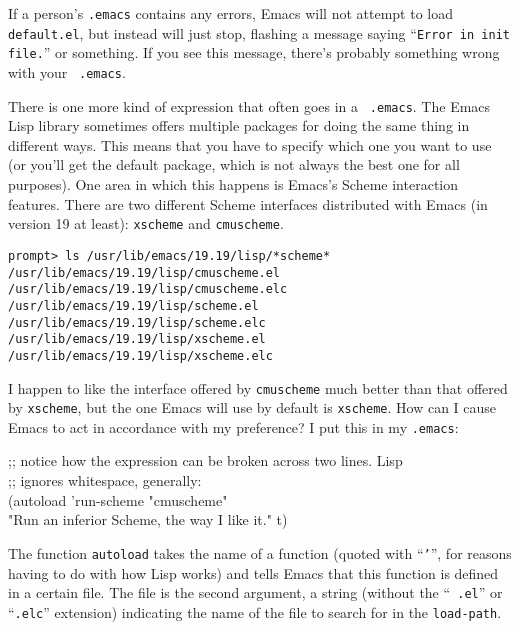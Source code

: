         If a person's {\tt .emacs} contains any errors, Emacs will not
attempt to load {\tt default.el}, but instead will just stop, flashing
a message saying ``{\tt Error in init file.}'' or something.  If you
see this message, there's probably something wrong with your {\tt
.emacs}.

        There is one more kind of expression that often goes in a {\tt
.emacs}.  The Emacs Lisp library sometimes offers multiple packages
for doing the same thing in different ways.  This means that you have
to specify which one you want to use (or you'll get the default
package, which is not always the best one for all purposes).  One area
in which this happens is Emacs's Scheme interaction features.  There
are two different Scheme interfaces distributed with Emacs (in version
19 at least): {\tt xscheme} and {\tt cmuscheme}.

\begin{screen}
   \begin{verbatim}
prompt> ls /usr/lib/emacs/19.19/lisp/*scheme*
/usr/lib/emacs/19.19/lisp/cmuscheme.el
/usr/lib/emacs/19.19/lisp/cmuscheme.elc
/usr/lib/emacs/19.19/lisp/scheme.el
/usr/lib/emacs/19.19/lisp/scheme.elc
/usr/lib/emacs/19.19/lisp/xscheme.el
/usr/lib/emacs/19.19/lisp/xscheme.elc
   \end{verbatim}
\end{screen}

        I happen to like the interface offered by {\tt cmuscheme} much
better than that offered by {\tt xscheme}, but the one Emacs will use
by default is {\tt xscheme}.  How can I cause Emacs to act in
accordance with my preference?  I put this in my {\tt .emacs}:

\begin{screen}
   \begin{tt}
;; notice how the expression can be broken across two lines.  Lisp \\
;; ignores whitespace, generally: \\
(autoload 'run-scheme "cmuscheme" \\
        "Run an inferior Scheme, the way I like it." t)
   \end{tt}
\end{screen}
        
        The function {\tt autoload} takes the name of a function
(quoted with ``{\tt '}'', for reasons having to do with how Lisp
works) and tells Emacs that this function is defined in a certain
file.  The file is the second argument, a string (without the ``{\tt
.el}'' or ``{\tt .elc}'' extension) indicating the name of the file to
search for in the {\tt load-path}.  

